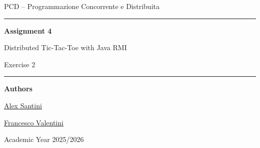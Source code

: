 \begin{titlepage}
    \centering
    \vspace*{2.2cm}

    {\Large PCD -- Programmazione Concorrente e Distribuita\par}
    \vspace{1.2cm}
    {\rule{0.82\textwidth}{0.5pt}\par}
    \vspace{0.9cm}
    {\huge\bfseries Assignment 4\par}
    \vspace{0.35cm}
    {\LARGE Distributed Tic-Tac-Toe with Java RMI\par}
    \vspace{0.25cm}
    {\large Exercise 2\par}
    \vspace{0.9cm}
    {\rule{0.82\textwidth}{0.5pt}\par}

    \vspace{1.6cm}
    {\large\textbf{Authors}\par}
    \vspace{0.25cm}
    {\large \href{https://github.com/AlexSantini10}{Alex Santini}\par}
    {\large \href{https://github.com/Val0rous}{Francesco Valentini}\par}

    \vfill
    {\large Academic Year 2025/2026\par}
    {\large \todayFullUK\par}
\end{titlepage}
